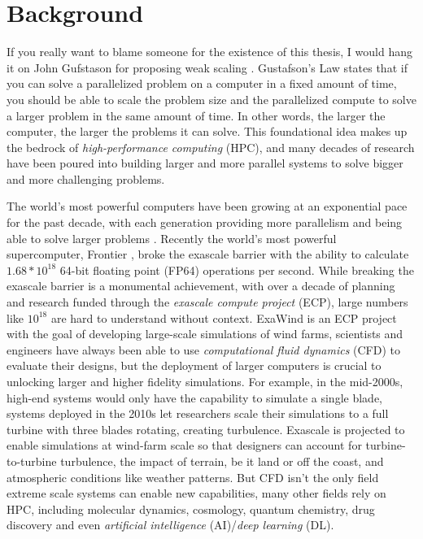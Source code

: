 
\glsresetall %
\chapter[Background]{Background}\label{ch:Background}

If you really want to blame someone for the existence of this thesis, I would hang it on John Gufstason for proposing weak scaling \cite{Gustafson1988GustafsonLaw}.
Gustafson's Law states that if you can solve a parallelized problem on a computer in a fixed amount of time, you should be able to scale the problem size and the parallelized compute to solve a larger problem in the same amount of time.
In other words, the larger the computer, the larger the problems it can solve.
This foundational idea makes up the bedrock of \textit{high-performance computing} (HPC), and many decades of research have been poured into building larger and more parallel systems to solve bigger and more challenging problems.

The world's most powerful computers have been growing at an exponential pace for the past decade, with each generation providing more parallelism and being able to solve larger problems \cite{Top500}.
Recently the world's most powerful supercomputer, Frontier \cite{Frontier}, broke the exascale barrier with the ability to calculate $1.68*10^{18}$ 64-bit floating point (FP64) operations per second. 
While breaking the exascale barrier is a monumental achievement, with over a decade of planning and research funded through the \textit{exascale compute project} (ECP), large numbers like $10^{18}$ are hard to understand without context.
ExaWind \cite{ExaWind} is an ECP project with the goal of developing large-scale simulations of wind farms, scientists and engineers have always been able to use \textit{computational fluid dynamics} (CFD) to evaluate their designs, but the deployment of larger computers is crucial to unlocking larger and higher fidelity simulations.
For example, in the mid-2000s, high-end systems would only have the capability to simulate a single blade, systems deployed in the 2010s let researchers scale their simulations to a full turbine with three blades rotating, creating turbulence.
Exascale is projected to enable simulations at wind-farm scale so that designers can account for turbine-to-turbine turbulence, the impact of terrain, be it land or off the coast, and atmospheric conditions like weather patterns.
But CFD isn't the only field extreme scale systems can enable new capabilities, many other fields rely on HPC, including molecular dynamics, cosmology, quantum chemistry, drug discovery and even \textit{artificial intelligence} (AI)/\textit{deep learning} (DL). 

